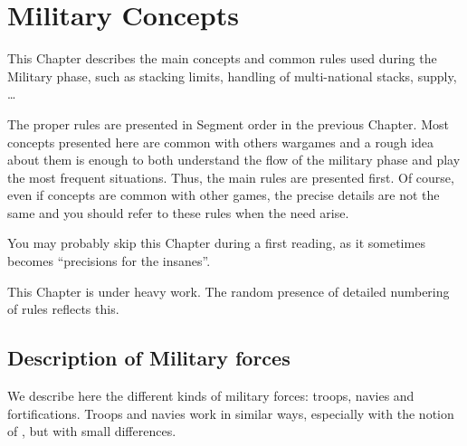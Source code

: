 
\chapter{Military Concepts}\label{chapter:MilitaryConcepts}

\newcommand{\StackArtillery}[1][]{%
  \aparag[Artillery value of stacks.]#1
  When two (or more) \ARMY are stacked together, their \terme{Artillery
    values} do not simply add. Instead, use the following computation:
  \bparag Take the \terme{Artillery value} of one \ARMY in the stack (the
  larger the better); add \bonus{+2} if there is another \ARMY with an
  \terme{Artillery value} of 2 or more; otherwise, add \bonus{+1} if there is
  another \ARMY with an \terme{Artillery value} of 1.}

\newcommand{\StackMorale}[1]{%
  \aparag[#1] A force formed by stacking or merging several units is
  \terme{Veteran} only if more than half of the \LD composing the units are
  \terme{Veteran}.}

\begin{designnote}
  This Chapter describes the main concepts and common rules used
  during the Military phase, such as stacking limits, handling of
  multi-national stacks, supply, \ldots

  The proper rules are presented in Segment order in the previous
  Chapter. Most concepts presented here are common with others wargames and a
  rough idea about them is enough to both understand the flow of the military
  phase and play the most frequent situations. Thus, the main rules are
  presented first. Of course, even if concepts are common with other games,
  the precise details are not the same and you should refer to these rules
  when the need arise.

  You may probably skip this Chapter during a first reading, as it sometimes
  becomes ``precisions for the insanes''.
\end{designnote}

\begin{todo}
  This Chapter is under heavy work. The random presence of detailed numbering
  of rules reflects this.
\end{todo}

\section{Description of Military forces}
\label{chMilitary:Description of Military forces}
We describe here the different kinds of military forces: troops, navies and
fortifications. Troops and navies work in similar ways, especially with the
notion of , but with small differences.

